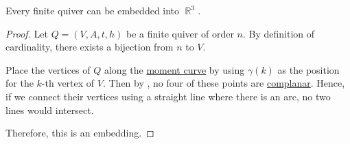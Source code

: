 \begin{proposition}\label{thm:quiver_can_be_embedded_into_r3}
  Every finite quiver can be embedded into \( \BbbR^3 \).
\end{proposition}
\begin{proof}
  Let \( Q = (V, A, t, h) \) be a finite quiver of order \( n \). By definition of cardinality, there exists a bijection from \( n \) to \( V \).

  Place the vertices of \( Q \) along the \hyperref[thm:moment_curve]{moment curve} by using \( \gamma(k) \) as the position for the \( k \)-th vertex of \( V \). Then by , no four of these points are \hyperref[def:colinear_complanar]{complanar}. Hence, if we connect their vertices using a straight line where there is an arc, no two lines would intersect.

  Therefore, this is an embedding.
\end{proof}

